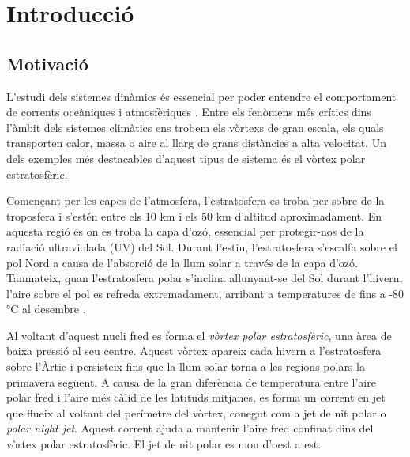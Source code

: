 \documentclass[12,twoside]{TFG-GM}
\theoremstyle{definition}
\theoremstyle{remark}
\begin{document}
\maketitle

{ \hypersetup{hidelinks} \tableofcontents }
\newpage

{ \hypersetup{hidelinks} \listoffigures }

\newpage


\section{Introducció}

\subsection{Motivació}

L'estudi dels sistemes dinàmics és essencial per poder entendre el comportament de corrents oceàniques i atmosfèriques \cite{Rypina2007}. Entre els fenòmens més crítics dins l'àmbit dels sistemes climàtics ens trobem els vòrtexs de gran escala, els quals transporten calor, massa o aire al llarg de grans distàncies a alta velocitat. Un dels exemples més destacables d'aquest tipus de sistema és el vòrtex polar estratosfèric.

Començant per les capes de l’atmosfera, l’estratosfera es troba per sobre de la troposfera i s’estén entre els 10 km i els 50 km d’altitud aproximadament. En aquesta regió és on es troba la capa d’ozó, essencial per protegir-nos de la radiació ultraviolada (UV) del Sol.
Durant l’estiu, l’estratosfera s’escalfa sobre el pol Nord a causa de l’absorció de la llum solar a través de la capa d’ozó. Tanmateix, quan l’estratosfera polar s’inclina allunyant-se del Sol durant l’hivern, l’aire sobre el pol es refreda extremadament, arribant a temperatures de fins a -80 °C al desembre \cite{Baldwin2021}.

Al voltant d’aquest nucli fred es forma el \textit{vòrtex polar estratosfèric}, una àrea de baixa pressió al seu centre. Aquest vòrtex apareix cada hivern a l’estratosfera sobre l’Àrtic i persisteix fins que la llum solar torna a les regions polars la primavera següent. A causa de la gran diferència de temperatura entre l’aire polar fred i l’aire més càlid de les latituds mitjanes, es forma un corrent en jet que flueix al voltant del perímetre del vòrtex, conegut com a jet de nit polar o \textit{polar night jet}. Aquest corrent ajuda a mantenir l’aire fred confinat dins del vòrtex polar estratosfèric. El jet de nit polar es mou d’oest a est.
\end{document}
